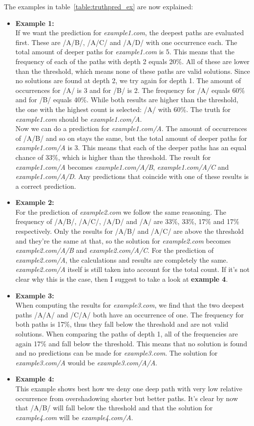 The examples in table~\ref{table:truthpred_ex} are now explained:
\begin{itemize}
	\item \textbf{Example 1:}\\
		If we want the prediction for \textit{example1.com}, the deepest paths are evaluated first. These are /A/B/, /A/C/ and /A/D/ with one occurrence each. The total amount of deeper paths for \textit{example1.com} is 5. This means that the frequency of each of the paths with depth 2 equals 20\%. All of these are lower than the threshold, which means none of these paths are valid solutions. Since no solutions are found at depth 2, we try again for depth 1. The amount of occurrences for /A/ is 3 and for /B/ is 2. The frequency for /A/ equals 60\% and for /B/ equals 40\%. While both results are higher than the threshold, the one with the highest count is selected: /A/ with 60\%. The truth for \textit{example1.com} should be \textit{example1.com/A}.
		\\[2ex]
		Now we can do a prediction for \textit{example1.com/A}. The amount of occurrences of /A/B/ and so on stays the same, but the total amount of deeper paths for \textit{example1.com/A} is 3. This means that each of the deeper paths has an equal chance of 33\%, which is higher than the threshold. The result for \textit{example1.com/A} becomes \textit{example1.com/A/B}, \textit{example1.com/A/C} and \textit{example1.com/A/D}. Any predictions that coincide with one of these results is a correct prediction.
	\item \textbf{Example 2:}\\
		For the prediction of \textit{example2.com} we follow the same reasoning. The frequency of /A/B/, /A/C/, /A/D/ and /A/ are 33\%, 33\%, 17\% and 17\% respectively. Only the results for /A/B/ and /A/C/ are above the threshold and they're the same at that, so the solution for \textit{example2.com} becomes \textit{example2.com/A/B} and \textit{example2.com/A/C}. For the prediction of \textit{example2.com/A}, the calculations and results are completely the same. \textit{example2.com/A} itself is still taken into account for the total count. If it's not clear why this is the case, then I suggest to take a look at \textbf{example 4}.
	\item \textbf{Example 3:}\\
		When computing the results for \textit{example3.com}, we find that the two deepest paths /A/A/ and /C/A/ both have an occurrence of one. The frequency for both paths is 17\%, thus they fall below the threshold and are not valid solutions. When comparing the paths of depth 1, all of the frequencies are again 17\% and fall below the threshold. This means that no solution is found and no predictions can be made for \textit{example3.com}. The solution for \textit{example3.com/A} would be \textit{example3.com/A/A}.
	\item \textbf{Example 4:}\\
		This example shows best how we deny one deep path with very low relative occurrence from overshadowing shorter but better paths. It's clear by now that /A/B/ will fall below the threshold and that the solution for \textit{example4.com} will be \textit{example4.com/A}.
\end{itemize}
